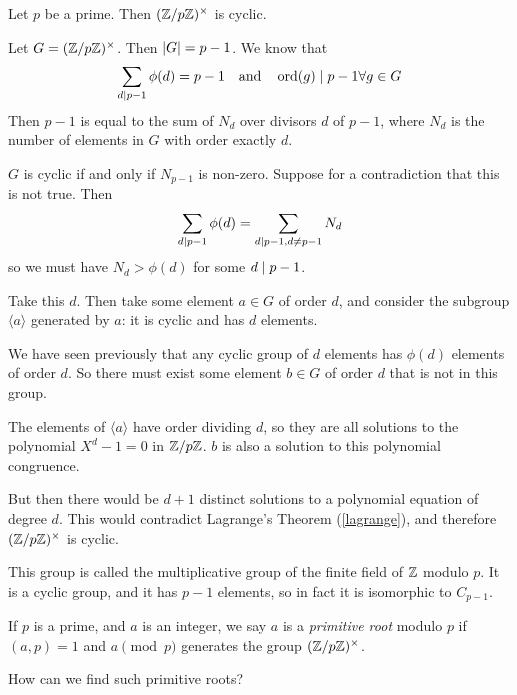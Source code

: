 \documentclass{article}
\begin{document}
\begin{theorem}
	Let $p$ be a prime. Then $(\mathbb{Z}/p\mathbb{Z})^\times$ is cyclic.
\end{theorem}

\begin{prf}
	Let $G = (\mathbb{Z}/p\mathbb{Z})^\times$. Then $\left\lvert G \right\rvert = p-1$. We know that
	\[
	\sum_{d \mid p-1} \phi(d) = p-1
	\quad \text{and} \quad
	\operatorname{ord} (g) \mid p-1 \forall g \in G
	\]
	Then $p-1$ is equal to the sum of $N_d$ over divisors $d$ of $p-1$, where $N_d$ is the number of elements in $G$ with order exactly $d$.
	
	$G$ is cyclic if and only if $N_{p-1}$ is non-zero. Suppose for a contradiction that this is not true. Then
	\[
	\sum_{d \mid p-1} \phi(d) = \sum_{d \mid p-1, d \neq p-1} N_d
	\]
	so we must have $N_d > \phi(d)$ for some $d \mid p-1$.
	
	Take this $d$. Then take some element $a \in G$ of order $d$, and consider the subgroup $\langle a \rangle$ generated by $a$: it is cyclic and has $d$ elements.
	
	We have seen previously that any cyclic group of $d$ elements has $\phi(d)$ elements of order $d$. So there must exist some element $b \in G$ of order $d$ that is not in this group.
	
	The elements of $\langle a \rangle$ have order dividing $d$, so they are all solutions to the polynomial $X^d - 1 = 0$ in $\mathbb{Z}/p\mathbb{Z}$. $b$ is also a solution to this polynomial congruence.
	
	But then there would be $d+1$ distinct solutions to a polynomial equation of degree $d$. This would contradict Lagrange's Theorem (\ref{lagrange}), and therefore $(\mathbb{Z}/p\mathbb{Z})^\times$ is cyclic.
\end{prf}

\begin{note}
	This group is called the multiplicative group of the finite field of $\mathbb{Z}$ modulo $p$. It is a cyclic group, and it has $p-1$ elements, so in fact it is isomorphic to $C_{p-1}$.
\end{note}

\begin{definition}
	If $p$ is a prime, and $a$ is an integer, we say $a$ is a \textit{primitive root} modulo $p$ if $(a, p) = 1$ and $a \pmod{p}$ generates the group $(\mathbb{Z}/p\mathbb{Z})^\times$.
\end{definition}

How can we find such primitive roots?
\end{document}
